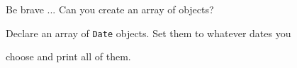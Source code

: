 Be brave ... Can you create an array of objects?

Declare an array of \texttt{Date} objects. Set them to whatever dates you

choose and print all of them.

